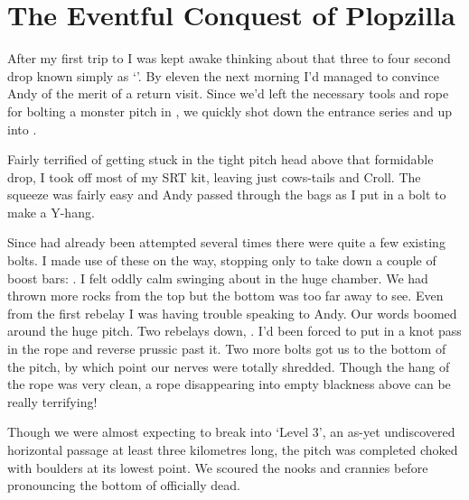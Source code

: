 


\section{The Eventful Conquest of Plopzilla}


After my first trip to  I was kept awake thinking about that
three to four second drop known simply as `'. By eleven the next
morning I'd managed to convince Andy of the merit of a return visit.
Since we'd left the necessary tools and rope for bolting a monster pitch in , we quickly shot down the  entrance series and
up  into .

Fairly terrified of getting stuck in the tight pitch head above that
formidable drop, I took off most of my SRT kit, leaving just cows-tails
and Croll. The squeeze was fairly easy and Andy passed through the bags as I put in a bolt to make a Y-hang.

Since  had already been attempted several times there were quite a few existing bolts. I made use of these on the way, stopping only to take down a couple of boost bars: . I felt oddly calm swinging about in the huge chamber. We had thrown more rocks from the top but the bottom was too far away to see. Even from the first rebelay I was having trouble speaking to Andy. Our words boomed around the huge pitch. Two rebelays down, . I'd been forced to put in a knot pass in the rope and reverse prussic past it. Two more bolts got us to the bottom of the pitch, by which point our nerves were totally shredded.
Though the hang of the rope was very clean, a rope disappearing into
empty blackness above can be really terrifying!

Though we were almost expecting to break into `Level 3', an as-yet
undiscovered horizontal passage at least three kilometres long, the
pitch was completed choked with boulders at its lowest point. We scoured
the nooks and crannies before pronouncing the bottom of  officially
dead.

